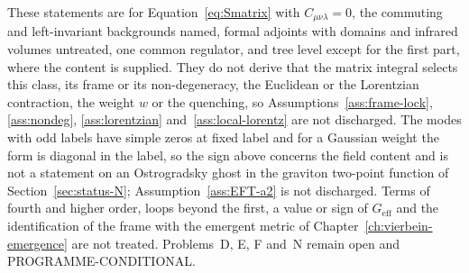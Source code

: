These statements are for Equation~\eqref{eq:Smatrix} with \(C_{\mu\nu\lambda}=0\), the commuting and left-invariant backgrounds named, formal adjoints with domains and infrared volumes untreated, one common regulator, and tree level except for the first part, where the content is supplied. They do not derive that the matrix integral selects this class, its frame or its non-degeneracy, the Euclidean or the Lorentzian contraction, the weight \(w\) or the quenching, so Assumptions~\ref{ass:frame-lock}, \ref{ass:nondeg}, \ref{ass:lorentzian} and~\ref{ass:local-lorentz} are not discharged. The modes with odd labels have simple zeros at fixed label and for a Gaussian weight the form is diagonal in the label, so the sign above concerns the field content and is not a statement on an Ostrogradsky ghost in the graviton two-point function of Section~\ref{sec:status-N}; Assumption~\ref{ass:EFT-a2} is not discharged. Terms of fourth and higher order, loops beyond the first, a value or sign of \(G_{\mathrm{eff}}\) and the identification of the frame with the emergent metric of Chapter~\ref{ch:vierbein-emergence} are not treated. Problems~D, E, F and~N remain open and PROGRAMME-CONDITIONAL.


